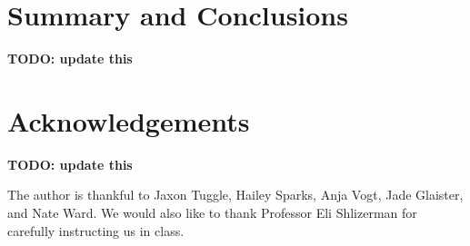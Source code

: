 \documentclass[11pt]{amsart}
\begin{document}
\section{Summary and Conclusions}\label{sec:conclusions} \textbf{TODO: update this}

\section*{Acknowledgements} \textbf{TODO: update this}

The author is thankful to Jaxon Tuggle, Hailey Sparks, Anja Vogt, Jade Glaister, and Nate Ward.
We would also like to thank Professor Eli Shlizerman for carefully instructing us in class.


\end{document}
